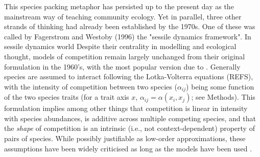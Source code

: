 \documentclass[a4paper,11pt]{article}
\begin{document}
This species packing metaphor has persisted up to the present day as the mainstream way of teaching community ecology. Yet in parallel, three other strands of thinking had already been established by the 1970s. One of these was called by Fagerstrom and Westoby (1996) the "sessile dynamics framework". In sessile dynamics world 
%
%
Despite their centrality in modelling and ecological thought, models
of competition remain largely unchanged from their original
formulation in the 1960's, with the most popular version due to
\citet{MacArthur-1967}.
Generally species are assumed to interact following the Lotka-Volterra
equations (REFS), with the intensity of competition between two
species ($\alpha_{ij}$) being some function of the two species traits
(for a trait axis $x$, $\alpha_{ij} = \alpha(x_i, x_j)$; see Methods).
%
This formulation implies among other things that competition is linear
in intensity with species abundances, is additive across multiple
competing species, and that the \emph{shape} of competition is an
intrinsic (i.e., not context-dependent) property of pairs of species.
%
While possibly justifiable as low-order approximations, these
assumptions have been widely criticised as long as the models have
been used
\citep[e.g.][]{Andrewartha-1953,May-1972,Abrams-1975}.
\end{document}
